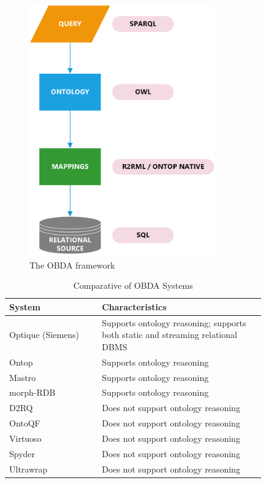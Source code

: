 \begin{figure}[ht]
    \centering
    \includegraphics[width=8cm]{res/data_integration.png}
    \caption{The \ac{OBDA} framework}
    \label{fig:obda_two}
\end{figure}


\begin{table}[ht]
    \centering
    \begin{tabular}{| p{0.3\linewidth} | p{0.53\linewidth} |}
    \hline
    \textbf{System} & \textbf{Characteristics} \\ \hline
    Optique (Siemens)  & Supports ontology reasoning; supports both static and streaming relational \ac{DBMS} \\ \hline
    Ontop  & Supports ontology reasoning \\ \hline
    Mastro  & Supports ontology reasoning \\ \hline
    morph-RDB  & Supports ontology reasoning \\ \hline
    D2RQ  & Does not support ontology reasoning \\ \hline
    OntoQF  & Does not support ontology reasoning \\ \hline
    Virtuoso  & Does not support ontology reasoning \\ \hline
    Spyder  & Does not support ontology reasoning \\ \hline
    Ultrawrap  & Does not support ontology reasoning \\ \hline
    \end{tabular}
    \caption{Comparative of \ac{OBDA} Systems \label{tab:obda_comparison}}
\end{table}

